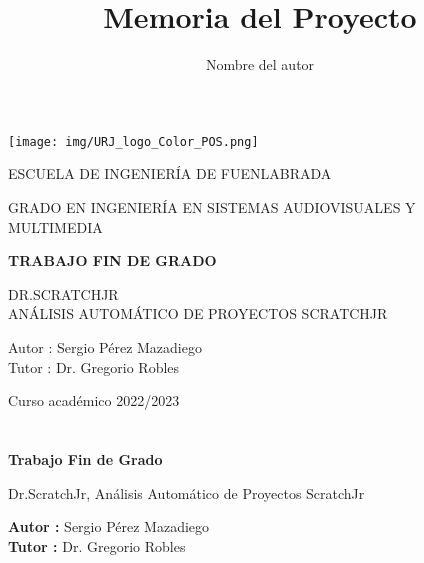 \documentclass[a4paper, 12pt]{book}
\title{Memoria del Proyecto}
\author{Nombre del autor}
\begin{document}
\renewcommand{\refname}{Bibliografía}  %
\renewcommand{\appendixname}{Apéndice}


\begin{titlepage}
\begin{center}
\texttt{[image: img/URJ\_logo\_Color\_POS.png]}

\vspace{1.75cm}

\LARGE
ESCUELA DE INGENIERÍA DE FUENLABRADA
\vspace{1cm}

\LARGE
GRADO EN INGENIERÍA EN SISTEMAS AUDIOVISUALES Y MULTIMEDIA

\vspace{1cm}
\LARGE
\textbf{TRABAJO FIN DE GRADO}

\vspace{2cm}

\Large
DR.SCRATCHJR \\ 
ANÁLISIS AUTOMÁTICO DE PROYECTOS SCRATCHJR

\vspace{2cm}

\large
Autor : Sergio Pérez Mazadiego \\
Tutor : Dr. Gregorio Robles\\
\vspace{1cm}

\large
Curso académico 2022/2023

\end{center}
\end{titlepage}

\newpage
\mbox{}
\thispagestyle{empty} %


\clearpage
{}
\chapter*{}

\vspace{-4cm}
\begin{center}
\LARGE
\textbf{Trabajo Fin de Grado}

\vspace{1cm}
\large
Dr.ScratchJr, Análisis Automático de Proyectos ScratchJr

\vspace{1cm}
\large
\textbf{Autor :} Sergio Pérez Mazadiego \\
\textbf{Tutor :} Dr. Gregorio Robles

\end{center}
\end{document}
